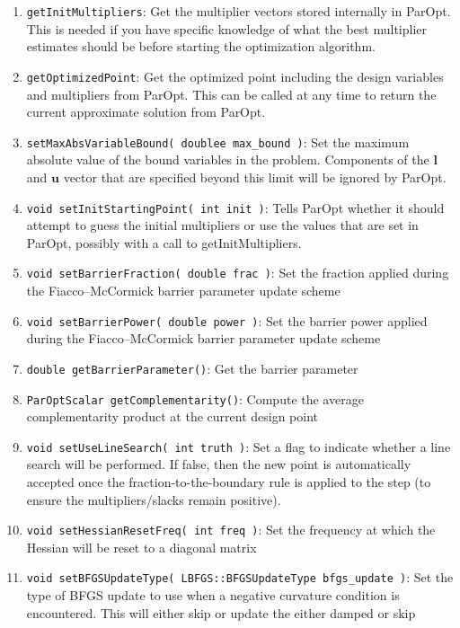 \documentclass[12pt]{article}
\newcommand{\mb}{\mathbf}
\begin{document}
\begin{enumerate}
\item \texttt{getInitMultipliers}: Get the multiplier vectors stored internally in ParOpt. This is needed if you have specific knowledge of what the best multiplier estimates should be before starting the optimization algorithm.

\item \texttt{getOptimizedPoint}: Get the optimized point including the design variables and multipliers from ParOpt. This can be called at any time to return the current approximate solution from ParOpt. 

\item \texttt{setMaxAbsVariableBound( doublee max\_bound )}: Set the maximum absolute value of the bound variables in the problem. Components of the $\mb{l}$ and $\mb{u}$ vector that are specified beyond this limit will be ignored by ParOpt.

\item \texttt{void setInitStartingPoint( int init )}: Tells ParOpt whether it should attempt to guess the initial multipliers or use the values that are set in ParOpt, possibly with a call to getInitMultipliers.

\item \texttt{void setBarrierFraction( double frac )}: Set the fraction applied during the Fiacco--McCormick barrier parameter update scheme
\item \texttt{void setBarrierPower( double power )}: Set the barrier power applied during the Fiacco--McCormick barrier parameter update scheme

\item \texttt{double getBarrierParameter()}: Get the barrier parameter
\item \texttt{ParOptScalar getComplementarity()}: Compute the average complementarity product at the current design point

\item \texttt{void setUseLineSearch( int truth )}: Set a flag to indicate whether a line search will be performed. If false, then the new point is automatically accepted once the fraction-to-the-boundary rule is applied to the step (to ensure the multipliers/slacks remain positive). 
 
\item \texttt{void setHessianResetFreq( int freq )}: Set the frequency at which the Hessian will be reset to a diagonal matrix
\item \texttt{void setBFGSUpdateType( LBFGS::BFGSUpdateType bfgs\_update )}: Set the type of BFGS update to use when a negative curvature condition is encountered. This will either skip or update the either damped or skip


\end{enumerate}
\end{document}
